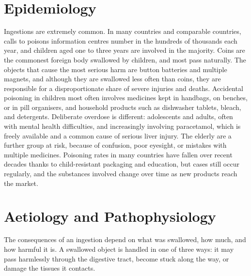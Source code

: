 \section*{Epidemiology}
Ingestions are extremely common. In many countries and comparable countries, calls to poisons information centres number in the hundreds of thousands each year, and children aged one to three years are involved in the majority. Coins are the commonest foreign body swallowed by children, and most pass naturally. The objects that cause the most serious harm are button batteries and multiple magnets, and although they are swallowed less often than coins, they are responsible for a disproportionate share of severe injuries and deaths. Accidental poisoning in children most often involves medicines kept in handbags, on benches, or in pill organisers, and household products such as dishwasher tablets, bleach, and detergents. Deliberate overdose is different: adolescents and adults, often with mental health difficulties, and increasingly involving paracetamol, which is freely available and a common cause of serious liver injury. The elderly are a further group at risk, because of confusion, poor eyesight, or mistakes with multiple medicines. Poisoning rates in many countries have fallen over recent decades thanks to child-resistant packaging and education, but cases still occur regularly, and the substances involved change over time as new products reach the market.

\section*{Aetiology and Pathophysiology}
The consequences of an ingestion depend on what was swallowed, how much, and how harmful it is. A swallowed object is handled in one of three ways: it may pass harmlessly through the digestive tract, become stuck along the way, or damage the tissues it contacts.

